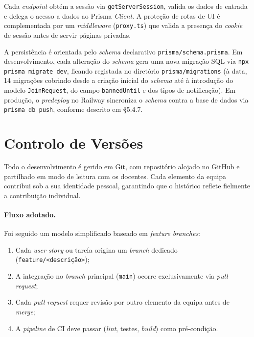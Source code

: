 \documentclass[11pt,a4paper]{article}
\begin{document}
Cada \emph{endpoint} obtém a sessão via \texttt{getServerSession}, valida os
dados de entrada e delega o acesso a dados ao Prisma \emph{Client}. A proteção
de rotas de UI é complementada por um \emph{middleware} (\texttt{proxy.ts})
que valida a presença do \emph{cookie} de sessão antes de servir páginas
privadas.

A persistência é orientada pelo \emph{schema} declarativo
\texttt{prisma/schema.prisma}. Em desenvolvimento, cada alteração do
\emph{schema} gera uma nova migração SQL via
\texttt{npx prisma migrate dev}, ficando registada no diretório
\texttt{prisma/migrations} (à data, 14 migrações cobrindo desde a criação
inicial do \emph{schema} até à introdução do modelo \texttt{JoinRequest},
do campo \texttt{bannedUntil} e dos tipos de notificação). Em produção, o
\emph{predeploy} no Railway sincroniza o \emph{schema} contra a base de dados
via \texttt{prisma db push}, conforme descrito em \S5.4.7.

\section{Controlo de Versões}

Todo o desenvolvimento é gerido em Git, com repositório alojado no GitHub e
partilhado em modo de leitura com os docentes. Cada elemento da equipa
contribui sob a sua identidade pessoal, garantindo que o histórico reflete
fielmente a contribuição individual.

\paragraph{Fluxo adotado.}
Foi seguido um modelo simplificado baseado em \emph{feature branches}:

\begin{enumerate}[leftmargin=*]
    \item Cada \emph{user story} ou tarefa origina um \emph{branch} dedicado
          (\texttt{feature/<descrição>});
    \item A integração no \emph{branch} principal (\texttt{main}) ocorre
          exclusivamente via \emph{pull request};
    \item Cada \emph{pull request} requer revisão por outro elemento da
          equipa antes de \emph{merge};
    \item A \emph{pipeline} de CI deve passar (\emph{lint}, testes,
          \emph{build}) como pré-condição.
\end{enumerate}
\end{document}
